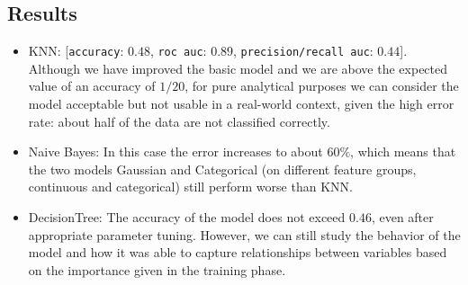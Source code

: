 \subsection{Results}
\begin{itemize}
    \item KNN: [\texttt{accuracy}: $0.48$, \texttt{roc auc}: $0.89$, \texttt{precision/recall auc}: $0.44$]. Although we have improved the basic model and we are above the expected value of an accuracy of $1/20$, for pure analytical purposes we can consider the model acceptable but not usable in a real-world context, given the high error rate: about half of the data are not classified correctly.
    \item Naive Bayes: In this case the error increases to about $60\%$, which means that the two models Gaussian and Categorical (on different feature groups, continuous and categorical) still perform worse than KNN.
    \item DecisionTree: The accuracy of the model does not exceed $0.46$, even after appropriate parameter tuning. However, we can still study the behavior of the model and how it was able to capture relationships between variables based on the importance given in the training phase.
\end{itemize}
